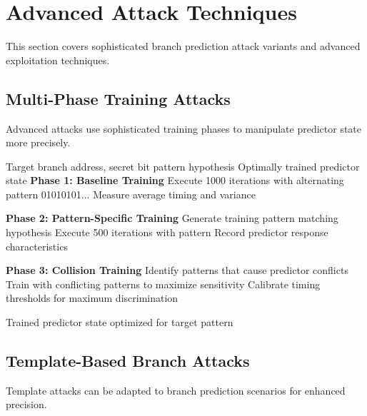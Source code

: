 \documentclass[11pt,a4paper]{article}
\theoremstyle{definition}
\begin{document}
\section{Advanced Attack Techniques}

This section covers sophisticated branch prediction attack variants and advanced exploitation techniques.

\subsection{Multi-Phase Training Attacks}

Advanced attacks use sophisticated training phases to manipulate predictor state more precisely.

\begin{algorithm}
\caption{Multi-Phase Branch Predictor Training}
\begin{algorithmic}[1]
\REQUIRE Target branch address, secret bit pattern hypothesis
\ENSURE Optimally trained predictor state
\STATE \textbf{Phase 1: Baseline Training}
\STATE Execute 1000 iterations with alternating pattern 01010101...
\STATE Measure average timing and variance

\STATE \textbf{Phase 2: Pattern-Specific Training}  
    \STATE Generate training pattern matching hypothesis
    \STATE Execute 500 iterations with pattern
    \STATE Record predictor response characteristics
\ENDFOR

\STATE \textbf{Phase 3: Collision Training}
\STATE Identify patterns that cause predictor conflicts
\STATE Train with conflicting patterns to maximize sensitivity
\STATE Calibrate timing thresholds for maximum discrimination

\RETURN Trained predictor state optimized for target pattern
\end{algorithmic}
\end{algorithm}

\subsection{Template-Based Branch Attacks}

Template attacks can be adapted to branch prediction scenarios for enhanced precision.
\end{document}
